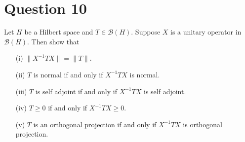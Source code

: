 \section{Question 10}
\horz

Let $H$ be a Hilbert space and $T\in \mathcal B(H).$ Suppose $X$ is a unitary operator in $\mathcal B(H).$ Then show that 
\begin{itemize}
\item[(i)] $\|X^{-1}TX\| = \|T\|.$
\item[(ii)] $T$ is normal if and only if $X^{-1}TX$ is normal.
\item[(iii)] $T$ is self adjoint if and only if $X^{-1}TX$ is self adjoint.
\item[(iv)] $T \geqslant 0$ if and only if $X^{-1}TX \geqslant 0.$
\item[(v)] $T$ is an orthogonal projection if and only if $X^{-1}TX$ is orthogonal projection. 
\end{itemize}
\horz

